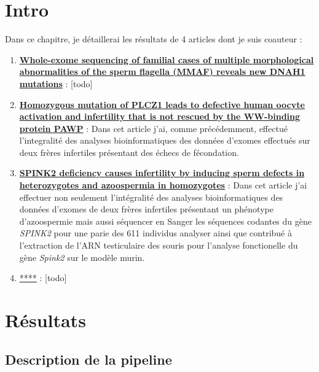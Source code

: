 \documentclass[12pt,twoside]{reedthesis}
\providecommand{\tightlist}{%
  \setlength{\itemsep}{0pt}\setlength{\parskip}{0pt}}
\theoremstyle{definition}
\theoremstyle{definition}
\theoremstyle{remark}
\begin{document}
  \section{Intro}\label{intro}
  
  Dans ce chapitre, je détaillerai les résultats de 4 articles dont je
  suis coauteur :
  
  \begin{enumerate}
  \def\labelenumi{\arabic{enumi}.}
  \tightlist
  \item
    \protect\hyperlink{famdnah1}{\textbf{Whole-exome sequencing of
    familial cases of multiple morphological abnormalities of the sperm
    flagella (MMAF) reveals new DNAH1 mutations}} : {[}todo{]}
  \item
    \protect\hyperlink{plcz}{\textbf{Homozygous mutation of PLCZ1 leads to
    defective human oocyte activation and infertility that is not rescued
    by the WW-binding protein PAWP}} : Dans cet article j'ai, comme
    précédemment, effectué l'integralité des analyses bioinformatiques des
    données d'exomes effectués sur deux frères infertiles présentant des
    échecs de fécondation.\\
  \item
    \protect\hyperlink{spink2}{\textbf{SPINK2 deficiency causes
    infertility by inducing sperm defects in heterozygotes and azoospermia
    in homozygotes}} : Dans cet article j'ai effectuer non seulement
    l'intégralité des analyses bioinformatiques des données d'exomes de
    deux frères infertiles présentant un phénotype d'azoospermie mais
    aussi séquencer en Sanger les séquences codantes du gène \emph{SPINK2}
    pour une parie des 611 individus analyser ainsi que contribué à
    l'extraction de l'ARN testiculaire des souris pour l'analyse
    fonctionelle du gène \emph{Spink2} sur le modèle murin.\\
  \item
    \protect\hyperlink{cohortemmah}{****} : {[}todo{]}
  \end{enumerate}
  
  \section{Résultats}\label{resultats}
  
  \subsection{Description de la
  pipeline}\label{description-de-la-pipeline}
  
\end{document}
